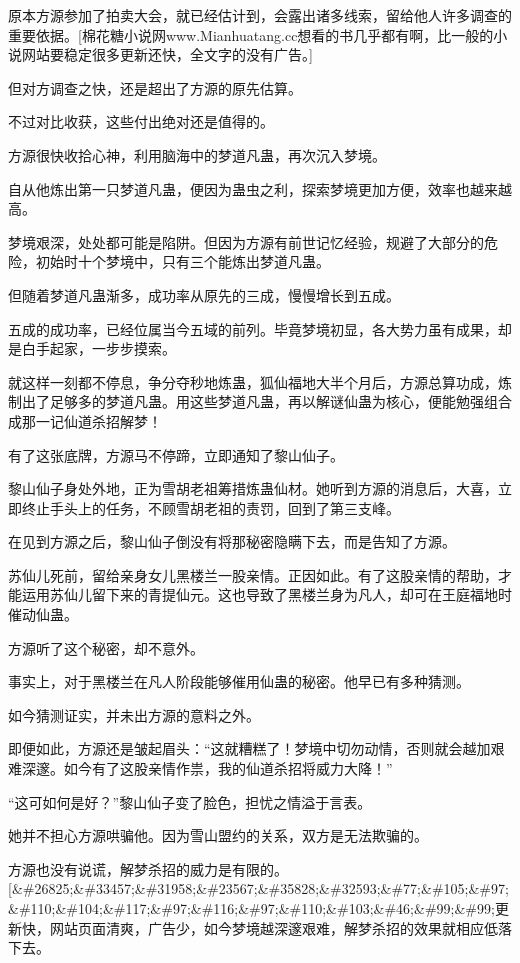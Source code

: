 
\begin{this_body}

原本方源参加了拍卖大会，就已经估计到，会露出诸多线索，留给他人许多调查的重要依据。[棉花糖小说网www.Mianhuatang.cc想看的书几乎都有啊，比一般的小说网站要稳定很多更新还快，全文字的没有广告。]

但对方调查之快，还是超出了方源的原先估算。

不过对比收获，这些付出绝对还是值得的。

方源很快收拾心神，利用脑海中的梦道凡蛊，再次沉入梦境。

自从他炼出第一只梦道凡蛊，便因为蛊虫之利，探索梦境更加方便，效率也越来越高。

梦境艰深，处处都可能是陷阱。但因为方源有前世记忆经验，规避了大部分的危险，初始时十个梦境中，只有三个能炼出梦道凡蛊。

但随着梦道凡蛊渐多，成功率从原先的三成，慢慢增长到五成。

五成的成功率，已经位属当今五域的前列。毕竟梦境初显，各大势力虽有成果，却是白手起家，一步步摸索。

就这样一刻都不停息，争分夺秒地炼蛊，狐仙福地大半个月后，方源总算功成，炼制出了足够多的梦道凡蛊。用这些梦道凡蛊，再以解谜仙蛊为核心，便能勉强组合成那一记仙道杀招解梦！

有了这张底牌，方源马不停蹄，立即通知了黎山仙子。

黎山仙子身处外地，正为雪胡老祖筹措炼蛊仙材。她听到方源的消息后，大喜，立即终止手头上的任务，不顾雪胡老祖的责罚，回到了第三支峰。

在见到方源之后，黎山仙子倒没有将那秘密隐瞒下去，而是告知了方源。

苏仙儿死前，留给亲身女儿黑楼兰一股亲情。正因如此。有了这股亲情的帮助，才能运用苏仙儿留下来的青提仙元。这也导致了黑楼兰身为凡人，却可在王庭福地时催动仙蛊。

方源听了这个秘密，却不意外。

事实上，对于黑楼兰在凡人阶段能够催用仙蛊的秘密。他早已有多种猜测。

如今猜测证实，并未出方源的意料之外。

即便如此，方源还是皱起眉头：“这就糟糕了！梦境中切勿动情，否则就会越加艰难深邃。如今有了这股亲情作祟，我的仙道杀招将威力大降！”

“这可如何是好？”黎山仙子变了脸色，担忧之情溢于言表。

她并不担心方源哄骗他。因为雪山盟约的关系，双方是无法欺骗的。

方源也没有说谎，解梦杀招的威力是有限的。[\&\#26825;\&\#33457;\&\#31958;\&\#23567;\&\#35828;\&\#32593;\&\#77;\&\#105;\&\#97;\&\#110;\&\#104;\&\#117;\&\#97;\&\#116;\&\#97;\&\#110;\&\#103;\&\#46;\&\#99;\&\#99;更新快，网站页面清爽，广告少，如今梦境越深邃艰难，解梦杀招的效果就相应低落下去。


\end{this_body}
